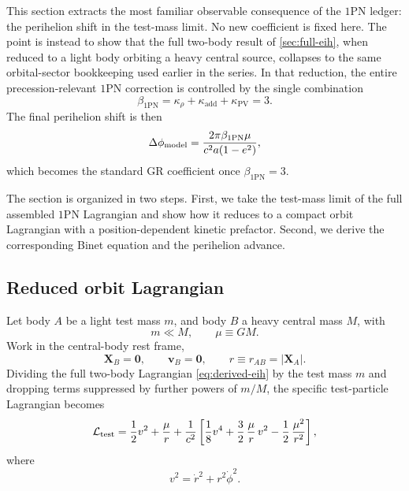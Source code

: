 \documentclass[11pt]{article}
\newcommand{\vct}{\mathbf v}
\newcommand{\kadd}{\kappa_{\mathrm{add}}}
\newcommand{\kPV}{\kappa_{\mathrm{PV}}}
\newcommand{\krho}{\kappa_{\rho}}
\newcommand{\betaPN}{\beta_{\mathrm{1PN}}}
\begin{document}
This section extracts the most familiar observable consequence of the \(1\)PN ledger:
the perihelion shift in the test-mass limit. No new coefficient is fixed here. The point
is instead to show that the full two-body result of \cref{sec:full-eih}, when reduced to a
light body orbiting a heavy central source, collapses to the same orbital-sector
bookkeeping used earlier in the series. In that reduction, the entire precession-relevant
\(1\)PN correction is controlled by the single combination
\begin{equation}
\betaPN=\krho+\kadd+\kPV=3.
\label{eq:orbit-beta-three}
\end{equation}
The final perihelion shift is then
\begin{equation}
\Delta\phi_{\rm model}
=
\frac{2\pi\betaPN\mu}{c^2 a(1-e^2)},
\label{eq:orbit-deltaphi-general-intro}
\end{equation}
which becomes the standard GR coefficient once \(\betaPN=3\).

The section is organized in two steps. First, we take the test-mass limit of the full
assembled \(1\)PN Lagrangian and show how it reduces to a compact orbit Lagrangian with a
position-dependent kinetic prefactor. Second, we derive the corresponding Binet equation
and the perihelion advance.

\subsection{Reduced orbit Lagrangian}
\label{sec:orbit-lagrangian}

Let body \(A\) be a light test mass \(m\), and body \(B\) a heavy central mass \(M\), with
\begin{equation}
m\ll M,
\qquad
\mu\equiv GM.
\label{eq:test-mass-limit-def}
\end{equation}
Work in the central-body rest frame,
\begin{equation}
\mathbf X_B=\mathbf 0,
\qquad
\vct_B=\mathbf 0,
\qquad
r\equiv r_{AB}=|\mathbf X_A|.
\label{eq:central-rest-frame}
\end{equation}
Dividing the full two-body Lagrangian \eqref{eq:derived-eih} by the test mass \(m\) and
dropping terms suppressed by further powers of \(m/M\), the specific test-particle
Lagrangian becomes
\begin{equation}
\mathcal L_{\rm test}
=
\frac12 v^2
+\frac{\mu}{r}
+\frac{1}{c^2}
\left[
\frac18 v^4
+\frac32\,\frac{\mu}{r}\,v^2
-\frac12\,\frac{\mu^2}{r^2}
\right],
\label{eq:test-particle-lagrangian-full}
\end{equation}
where
\begin{equation}
v^2=\dot r^2+r^2\dot\phi^2.
\label{eq:polar-vsq}
\end{equation}
\end{document}
